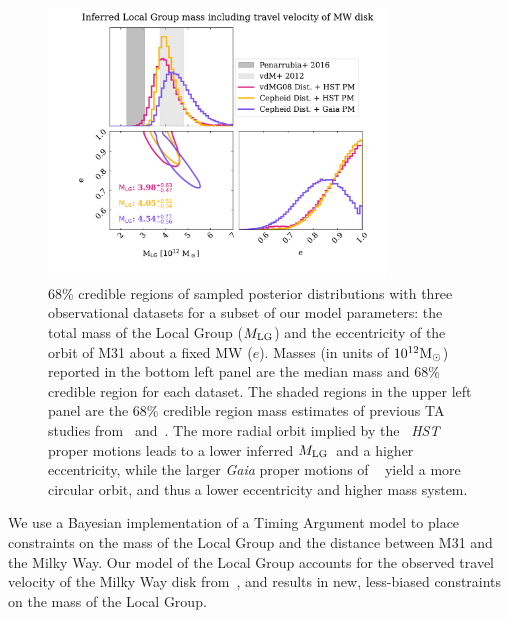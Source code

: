\documentclass[twocolumn]{aastex631}
\newcommand{\mlg}{\ensuremath{M_{\rm LG}}}
\begin{document}
\begin{figure}[htb]
  \centering
  \includegraphics[width=0.8\textwidth,trim = 2.3cm 1.5cm 1cm 0cm,clip=true]
  {analyze-runs-contour.pdf}
  \caption{\label{fig:contour} 68\% credible regions of sampled posterior
  distributions with three observational datasets for a subset of our model
  parameters: the total mass of the Local Group (\mlg)
  and the eccentricity of the orbit of M31 about a fixed MW ($e$). 
  Masses (in units of $10^{12}\mathrm{M}_\odot$) reported in the bottom left panel are 
  the median mass and 68\% credible region for each dataset.
  The shaded regions in the upper left panel are the 68\% credible region mass 
  estimates of previous TA studies from~\cite{vdm2012} 
  and~\cite{Penarrubia2016}.
  The more radial orbit implied by the~\cite{vdm2012} \textit{HST} proper
  motions leads to a lower inferred \mlg\ and a higher
  eccentricity, while the larger \textit{Gaia} proper motions of
  ~\cite{Salomon2021} yield a more circular orbit, and thus a lower eccentricity
   and higher mass system.
   }
\end{figure}


We use a Bayesian implementation of a Timing Argument model to place constraints
on the mass of the Local Group and the distance between M31 and the Milky Way.
Our model of the Local Group accounts for the observed travel velocity of 
the Milky Way disk from~\cite{Petersen2021}, and results in new,
less-biased constraints on the mass of the Local Group.
\end{document}
